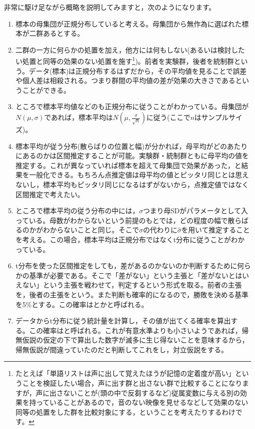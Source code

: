 \documentclass{ltjsbook}
\begin{document}
非常に駆け足ながら概略を説明してみますと，次のようになります。
\begin{enumerate}
	\item 標本の母集団が正規分布していると考える。母集団から無作為に選ばれた標本が二群あるとする。
	\item 二群の一方に何らかの処置を加え，他方には何もしない(あるいは検討したい処置と同等の効果のない処置を施す\footnote{たとえば「単語リストは声に出して覚えたほうが記憶の定着度が高い」ということを検証したい場合，声に出す群と出さない群で比較することになりますが，声に出さないことが(頭の中で反芻するなど)従属変数に与える別の効果を持っていることがあるので，音のない映像を見せるなどして効果のない同等の処置をした群を比較対象にする，ということを考えたりするわけです。})。前者を実験群，後者を統制群という。データ(標本)は正規分布するはずだから，その平均値を見ることで誤差や個人差は相殺される。つまり群間の平均値の差が効果の大きさであるということができる。
	\item ところで標本平均値などのも正規分布に従うことがわかっている。母集団が$N(\mu,\sigma)$であれば，標本平均は$N(\mu, \frac{\sigma}{\sqrt{n}})$に従う(ここで$n$はサンプルサイズ)。
	\item 標本平均が従う分布(散らばりの位置と幅)が分かれば，母平均がどのあたりにあるのかは区間推定することが可能。実験群・統制群ともに母平均の値を推定する。これが異なっていれば標本を超えて母集団で効果があった，と結果を一般化できる。もちろん点推定値は母平均の値とピッタリ同じとは思えないし，標本平均もピッタリ同じになるはずがないから，点推定値ではなく区間推定で考えたい。
	\item ところで標本平均の従う分布の中には，$\sigma$つまり母SDがパラメータとして入っている。母数がわからないという前提のもとでは，どの程度の幅で散らばるのかがわからないことと同じ。そこで$\sigma$の代わりに$\hat{\sigma}$を用いて推定することを考える。この場合，標本平均は正規分布ではなくt分布に従うことがわかっている。
	\item t分布を使った区間推定をしても，差があるのかないのか判断するために何らかの基準が必要である。そこで「差がない」という主張と「差がないとはいえない」という主張を戦わせて，判定するという形式を取る。前者の主張を，後者の主張をという。また判断も確率的になるので，勝敗を決める基準を5\%とする。この確率はとかと呼ばれる。
	\item データからt分布に従う統計量を計算し，その値が出てくる確率を算出する。この確率はと呼ばれる。これが有意水準よりも小さいようであれば，帰無仮説の仮定の下で算出した数字が滅多に生じ得ないことを意味するから，帰無仮説が間違っていたのだと判断してこれをし，対立仮説をする。
\end{enumerate}
\end{document}
